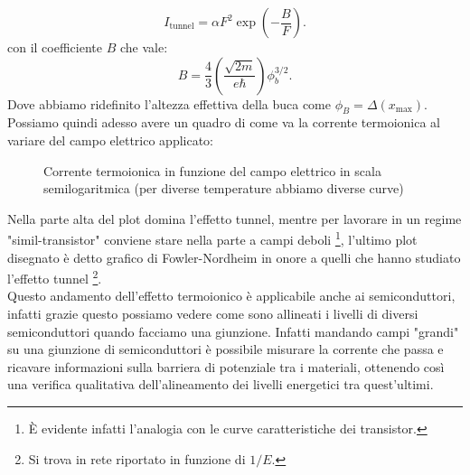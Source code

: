 \[
	I_{\text{tunnel}} = \alpha F^2\exp\left( -\frac{B}{F} \right) 
.\] 
con il coefficiente $B$ che vale:
\[
	B = \frac{4}{3}\left( \frac{\sqrt{2m} }{e \hbar} \right) \phi_{b}^{3 /2}
.\] 
Dove abbiamo ridefinito l'altezza effettiva della buca come $\phi _{B} = \Delta ( x_{\text{max}}) $.\\
Possiamo quindi adesso avere un quadro di come va la corrente termoionica al variare del campo elettrico applicato:
\begin{figure}[H]
    \centering
    \caption{\scriptsize Corrente termoionica in funzione del campo elettrico in scala semilogaritmica (per diverse temperature abbiamo diverse curve)}
    \label{fig:corrente-termoionica-in-funzione-del-campo-elettrico}
\end{figure}
\noindent
Nella parte alta del plot domina l'effetto tunnel, mentre per lavorare in un regime "simil-transistor" conviene stare nella parte a campi deboli \footnote{È evidente infatti l'analogia con le curve caratteristiche dei transistor.}, l'ultimo plot disegnato è detto grafico di Fowler-Nordheim in onore a quelli che hanno studiato l'effetto tunnel \footnote{Si trova in rete riportato in funzione di $1 /E$.}.\\
Questo andamento dell'effetto termoionico è applicabile anche ai semiconduttori, infatti grazie  questo possiamo vedere come sono allineati i livelli di diversi semiconduttori quando facciamo una giunzione. Infatti mandando campi "grandi" su una giunzione di semiconduttori è possibile misurare la corrente che passa e ricavare informazioni sulla barriera di potenziale tra i materiali, ottenendo così una verifica qualitativa dell'alineamento dei livelli energetici tra quest'ultimi. 

